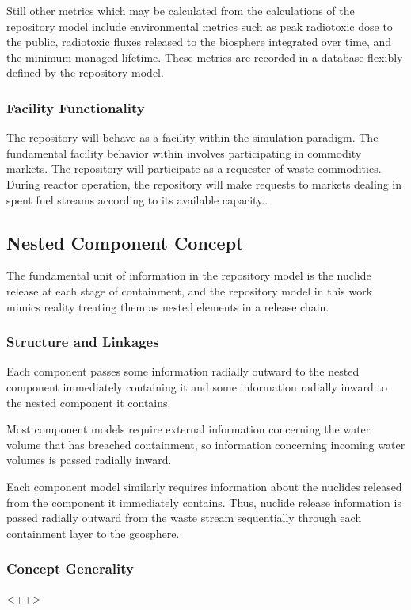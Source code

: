 Still other metrics which may be calculated from the calculations of 
the repository model include environmental metrics such as peak 
radiotoxic dose to the public, radiotoxic fluxes released to the 
biosphere integrated over time, and the minimum managed lifetime.  
These metrics are recorded in a database flexibly defined by the repository 
model.

\subsubsection{Facility Functionality}
The repository will behave as a facility within the \Cyclus simulation 
paradigm. The fundamental facility behavior within \Cyclus involves 
participating in commodity markets. The repository will participate as 
a requester of waste commodities. During reactor operation, the 
repository will make requests to markets dealing in spent fuel streams 
according to its available capacity..

\subsection{Nested Component Concept}
The fundamental unit of information in the repository model is the 
nuclide release at each stage of containment, and the repository model 
in this work mimics reality treating them as nested elements in a 
release chain.

\subsubsection{Structure and Linkages}
Each component passes some information radially outward to the nested 
component immediately containing it and some information radially 
inward to the nested component it contains.

Most component models require external information concerning the 
water volume that has breached containment, so information concerning 
incoming water volumes is passed radially inward. 

Each component model similarly requires information about the nuclides 
released from the component it immediately contains.  Thus, nuclide 
release information is passed radially outward from the waste stream 
sequentially through each containment layer to the geosphere.

\subsubsection{Concept Generality}<++>
